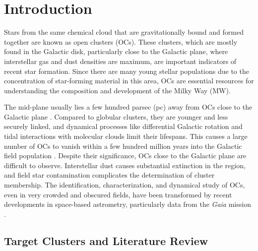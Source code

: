 \documentclass[referee]{raa}            %
\begin{document}

\maketitle

\section{Introduction}\label{Introduction}

Stars from the same chemical cloud that are gravitationally bound and formed together are known as open clusters (OCs). These clusters, which are mostly found in the Galactic disk, particularly close to the Galactic plane, where interstellar gas and dust densities are maximum, are important indicators of recent star formation.  Since there are many young stellar populations due to the concentration of star-forming material in this area, OCs are essential resources for understanding the composition and development of the Milky Way (MW).

The mid-plane usually lies a few hundred parsec (pc) away from OCs close to the Galactic plane \citep{2016A&A...593A.116J}. Compared to globular clusters, they are younger and less securely linked, and dynamical processes like differential Galactic rotation and tidal interactions with molecular clouds limit their lifespans. This causes a large number of OCs to vanish within a few hundred million years into the Galactic field population \citep{2018A&A...614A..22P}. Despite their significance, OCs close to the Galactic plane are difficult to observe. Interstellar dust causes substantial extinction in the region, and field star contamination complicates the determination of cluster membership. The identification, characterization, and dynamical study of OCs, even in very crowded and obscured fields, have been transformed by recent developments in space-based astrometry, particularly data from the \textit{Gaia} mission \citep{Cantat_2020, CastroGinard2022}.

\subsection{Target Clusters and Literature Review}
\end{document}
